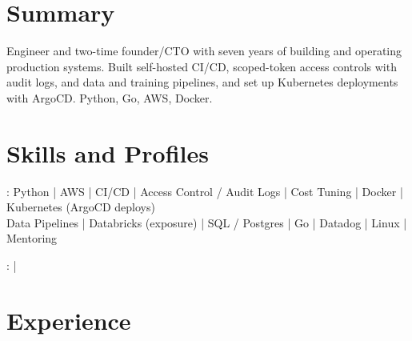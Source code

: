 \documentclass[print]{jack-resume}
\begin{document}
\pagecolor{darkmodeBackground}


\begin{minipage}[t][1cm][t]{.03\textwidth}
    \hfill
\end{minipage}

\section{Summary}
Engineer and two-time founder/CTO with seven years of building and operating production systems. Built self-hosted CI/CD, scoped-token access controls with audit logs, and data and training pipelines, and set up Kubernetes deployments with ArgoCD. Python, Go, AWS, Docker.
\sectionsep

\section{Skills and Profiles}
:
Python \hfill | \hfill
AWS \hfill | \hfill
CI/CD \hfill | \hfill
Access Control / Audit Logs \hfill | \hfill
Cost Tuning \hfill | \hfill
Docker \hfill | \hfill
Kubernetes (ArgoCD deploys) \\
\hspace{1.0cm} Data Pipelines \hfill | \hfill
Databricks (exposure) \hfill | \hfill
SQL / Postgres \hfill | \hfill
Go \hfill | \hfill
Datadog \hfill | \hfill
Linux \hfill | \hfill
Mentoring \\

\raggedright{
    :
      \href{https://www.linkedin.com/in/jack-sturtevant/}{ \ExternalLink} |
     \href{https://github.com/jacksturt}{ \ExternalLink}}

\section{Experience}
\end{document}

